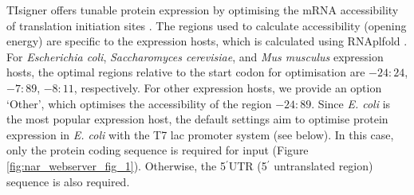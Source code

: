 TIsigner offers tunable protein expression by optimising the mRNA
accessibility of translation initiation sites
\cite{Bhandari2021-wd}. The regions used to
calculate accessibility (opening energy) are specific to the expression
hosts, which is calculated using RNAplfold
\cite{Bernhart2006-ma,Bernhart2011-cc,Lorenz2011-rg}. For
\emph{Escherichia coli}, \emph{Saccharomyces cerevisiae}, and \emph{Mus
musculus} expression hosts, the optimal regions relative to the start
codon for optimisation are $-24:24$, $-7:89$, $-8:11$, respectively. For other
expression hosts, we provide an option `Other', which optimises the
accessibility of the region $−24:89$. Since \emph{E. coli} is the most
popular expression host, the default settings aim to optimise protein
expression in \emph{E. coli} with the T7 lac promoter system (see
below). In this case, only the protein coding sequence is required for
input (Figure \ref{fig:nar_webserver_fig_1}). Otherwise, the 5$^{\prime}$UTR (5$^{\prime}$ 
untranslated region) sequence is also required.



